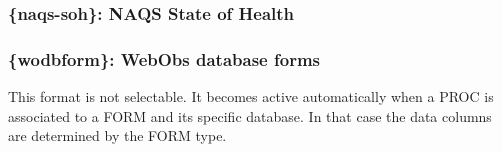 \subsubsection{\{naqs-soh\}: NAQS State of Health}

\subsubsection{\{wodbform\}: WebObs database forms}

This format is not selectable. It becomes active automatically when a PROC is associated to a FORM and its specific database. In that case the data columns are determined by the FORM type.

